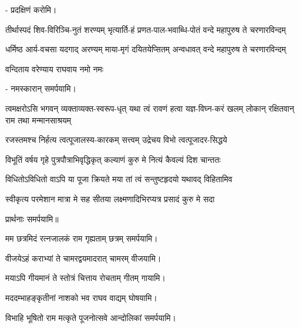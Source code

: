 \namah - प्रदक्षिणं करोमि।

{तीर्थास्पदं शिव-विरिञ्चि-नुतं शरण्यम्}
{भृत्यार्ति-हं प्रणत-पाल-भवाब्धि-पोतं}
{वन्दे महापुरुष ते चरणारविन्दम्}

{धर्मिष्ठ आर्य-वचसा यदगाद् अरण्यम्}
{माया-मृगं दयितयेप्सितम् अन्वधावत्}
{वन्दे महापुरुष ते चरणारविन्दम्}

{वन्दिताय वरेण्याय राघवाय नमो नमः } 

\namah - नमस्कारान् समर्पयामि।

\resetShloka
\threelineshloka
{त्वमक्षरोऽसि भगवन् व्यक्ताव्यक्त-स्वरूप-धृत्}
{यथा त्वं रावणं हत्वा यज्ञ-विघ्न-करं खलम्}
{लोकान् रक्षितवान् राम तथा मन्मानसाश्रयम्}

\twolineshloka
{रजस्तमश्च निर्हत्य त्वत्पूजालस्य-कारकम्}
{सत्त्वम् उद्रेचय विभो त्वत्पूजादर-सिद्धये}

\twolineshloka
{विभूतिं वर्षय गृहे पुत्रपौत्राभिवृद्धिकृत्}
{कल्याणं कुरु मे नित्यं कैवल्यं दिश चान्ततः}

\twolineshloka
{विधितोऽविधितो वाऽपि या पूजा क्रियते मया}
{तां त्वं सन्तुष्टहृदयो यथावद् विहितामिव}

\twolineshloka
{स्वीकृत्य परमेशान मात्रा मे सह सीतया}
{लक्ष्मणादिभिरप्यत्र प्रसादं कुरु मे सदा}

प्रार्थनाः समर्पयामि॥

\begin{center}

\end{center}

{मम छत्रमिदं रत्नजालकं राम गृह्यताम्}
\hfill छत्रम् समर्पयामि।


{वीजयेऽहं कराभ्यां ते चामरद्वयमादरात्}
\hfill चामरम् वीजयामि।


{मयाऽपि गीयमानं ते स्तोत्रं चित्ताय रोचताम्}
\hfill गीतम् गायामि।


{मददम्भाहङ्कृतीनां नाशको भव राघव}
\hfill वाद्यम् घोषयामि।


{विभाहि भूषितो राम मत्कृते पूजनोत्सवे}
\hfill आन्दोलिकां समर्पयामि।


